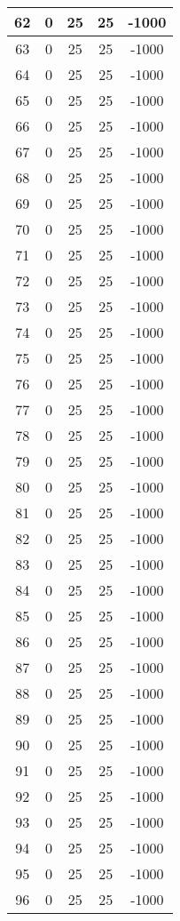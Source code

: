 \documentclass[letterpaper, 12pt]{article}
\begin{document}
\begin{longtable}{|c|c|c|c|c|}
\hline
62 & 0 & 25 & 25 & -1000 \\
\hline
63 & 0 & 25 & 25 & -1000 \\
\hline
64 & 0 & 25 & 25 & -1000 \\
\hline
65 & 0 & 25 & 25 & -1000 \\
\hline
66 & 0 & 25 & 25 & -1000 \\
\hline
67 & 0 & 25 & 25 & -1000 \\
\hline
68 & 0 & 25 & 25 & -1000 \\
\hline
69 & 0 & 25 & 25 & -1000 \\
\hline
70 & 0 & 25 & 25 & -1000 \\
\hline
71 & 0 & 25 & 25 & -1000 \\
\hline
72 & 0 & 25 & 25 & -1000 \\
\hline
73 & 0 & 25 & 25 & -1000 \\
\hline
74 & 0 & 25 & 25 & -1000 \\
\hline
75 & 0 & 25 & 25 & -1000 \\
\hline
76 & 0 & 25 & 25 & -1000 \\
\hline
77 & 0 & 25 & 25 & -1000 \\
\hline
78 & 0 & 25 & 25 & -1000 \\
\hline
79 & 0 & 25 & 25 & -1000 \\
\hline
80 & 0 & 25 & 25 & -1000 \\
\hline
81 & 0 & 25 & 25 & -1000 \\
\hline
82 & 0 & 25 & 25 & -1000 \\
\hline
83 & 0 & 25 & 25 & -1000 \\
\hline
84 & 0 & 25 & 25 & -1000 \\
\hline
85 & 0 & 25 & 25 & -1000 \\
\hline
86 & 0 & 25 & 25 & -1000 \\
\hline
87 & 0 & 25 & 25 & -1000 \\
\hline
88 & 0 & 25 & 25 & -1000 \\
\hline
89 & 0 & 25 & 25 & -1000 \\
\hline
90 & 0 & 25 & 25 & -1000 \\
\hline
91 & 0 & 25 & 25 & -1000 \\
\hline
92 & 0 & 25 & 25 & -1000 \\
\hline
93 & 0 & 25 & 25 & -1000 \\
\hline
94 & 0 & 25 & 25 & -1000 \\
\hline
95 & 0 & 25 & 25 & -1000 \\
\hline
96 & 0 & 25 & 25 & -1000 \\

\end{longtable}
\end{document}
